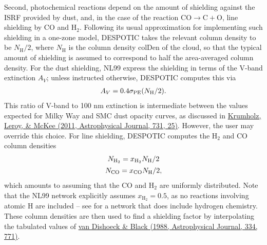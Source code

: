 \documentclass[letterpaper,10pt,english]{sphinxmanual}
\begin{document}
Second, photochemical reactions depend on the amount of shielding
against the ISRF provided by dust, and, in the case of the reaction
\(\mathrm{CO}\rightarrow\mathrm{C}+\mathrm{O}\), line shielding by
CO and \(\mathrm{H}_2\). Following its usual approximation for
implementing such shielding in a one-zone model, DESPOTIC takes the
relevant column density to be \(N_{\mathrm{H}}/2\), where
\(N_\mathrm{H}\) is the column density colDen of the cloud, so
that the typical amount of shielding is assumed to correspond to
half the area-averaged column density. For the dust shielding,
NL99 express the shielding in terms of the V-band extinction
\(A_V\); unless instructed otherwise, DESPOTIC computes this via
\begin{gather}
\begin{split}A_V = 0.4 \sigma_{\mathrm{PE}}(N_{\mathrm{H}}/2).\end{split}\notag
\end{gather}
This ratio of V-band to 100 nm extinction is intermediate
between the values expected for Milky Way and SMC dust opacity curves,
as discussed in \href{http://adsabs.harvard.edu/abs/2011ApJ...731...25K}{Krumholz, Leroy, \& McKee (2011, Astrophysical
Journal, 731, 25)}. However, the
user may override this choice. For line shielding, DESPOTIC computes
the \(\mathrm{H}_2\) and CO column densities
\begin{gather}
\begin{split}N_{\mathrm{H}_2} = x_{\mathrm{H}_2} N_{\mathrm{H}}/2\end{split}\notag\\\begin{split}N_\mathrm{CO} = x_\mathrm{CO} N_\mathrm{H} /2,\end{split}\notag
\end{gather}
which amounts to assuming that the CO and \(\mathrm{H}_2\) are
uniformly distributed. Note that the NL99 network explicitly assumes
\(x_{\mathrm{H}_2} = 0.5\), as no reactions involving atomic H are
included -- see {\hyperref[chemistry:sssec-nl99-gc]{\emph{}}} for a network that does include
hydrogen chemistry. These column densities are then used to find a
shielding factor by interpolating the tabulated values of \href{http://adsabs.harvard.edu/abs/1988ApJ...334..771V}{van Dishoeck
\& Black (1988, Astrophysical Journal, 334, 771)}.
\end{document}
